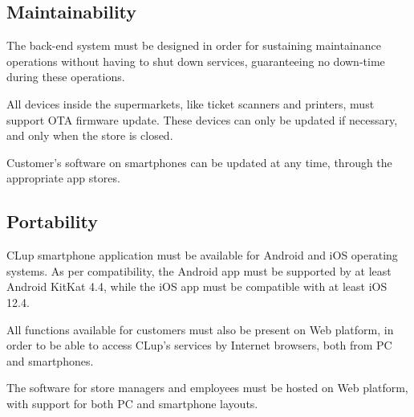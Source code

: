 \documentclass[../../main.tex]{subfiles}
\begin{document}
	\subsection{Maintainability}

	The back-end system must be designed in order for sustaining maintainance operations without having to 
	shut down services, guaranteeing no down-time during these operations.

	All devices inside the supermarkets, like ticket scanners and printers, must support OTA firmware update. These devices can only be updated if necessary, and only when the store is closed.

	Customer's software on smartphones can be updated at any time, through the appropriate app stores.

	\subsection{Portability}

	CLup smartphone application must be available for Android and iOS operating systems. As per compatibility, the Android app must be supported by at least Android KitKat 4.4, while the iOS app must be compatible with at least iOS 12.4.

	All functions available for customers must also be present on Web platform, in order to be able to access 
	CLup's services by Internet browsers, both from PC and smartphones.

	The software for store managers and employees must be hosted on Web platform, with support for both PC and smartphone layouts.

	
\end{document}
